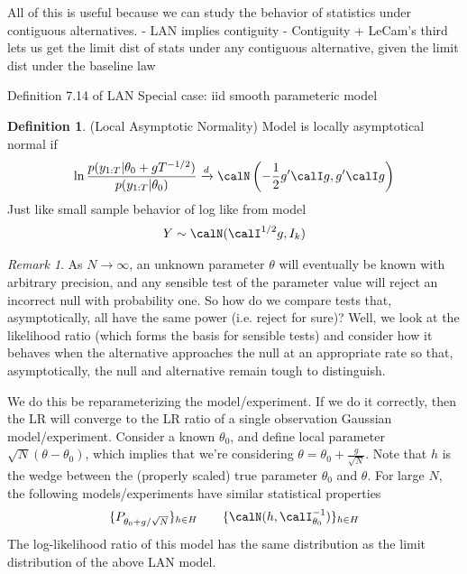 \documentclass[12pt]{article}
\theoremstyle{plain}
\theoremstyle{definition}
\newtheorem{defn}[thm]{Definition}
\theoremstyle{remark}
\newtheorem*{rmk}{Remark}
\newcommand{\ra}{\rightarrow}
\newcommand{\dto}{\xrightarrow{d}}
\begin{document}
All of this is useful because we can study the behavior of statistics
under contiguous alternatives.
- LAN implies contiguity
- Contiguity + LeCam's third lets us get the limit dist of stats under
  any contiguous alternative, given the limit dist under the baseline
  law

Definition 7.14 of LAN
Special case: iid smooth parameteric model



\begin{defn}(Local Asymptotic Normality)
Model is locally asymptotical normal if
\begin{align*}
  \ln
  \frac{p(y_{1:T}|\theta_0+gT^{-1/2})}{p(y_{1:T}|\theta_0)}
  \dto
  \calN\left(-\frac{1}{2}g'\calI g, g'\calI g\right)
\end{align*}
Just like small sample behavior of log like from model
\begin{align*}
  Y \sim \calN(\calI^{1/2}g,I_k)
\end{align*}
\end{defn}

\begin{rmk}
As $N\ra\infty$, an unknown parameter $\theta$ will eventually be known
with arbitrary precision, and any sensible test of the parameter value
will reject an incorrect null with probability one.
So how do we compare tests that, asymptotically, all have the same power
(i.e. reject for sure)?
Well, we look at the likelihood ratio (which forms the basis for
sensible tests) and consider how it behaves when the alternative
approaches the null at an appropriate rate so that, asymptotically, the
null and alternative remain tough to distinguish.

We do this be reparameterizing the model/experiment.
If we do it correctly, then the LR will converge to the LR ratio of a
single observation Gaussian model/experiment.
Consider a known $\theta_0$, and define local parameter
$\sqrt{N}(\theta-\theta_0)$, which implies that we're considering
$\theta=\theta_0+\frac{g}{\sqrt{N}}$.
Note that $h$ is the wedge between the (properly scaled) true parameter
$\theta_0$ and $\theta$.
For large $N$, the following models/experiments have similar statistical
properties
\begin{align*}
  \{P_{\theta_0+g/\sqrt{N}}\}_{h\in H}
  \qquad
  \{\calN(h,\calI_{\theta_0}^{-1})\}_{h\in H}
\end{align*}
The log-likelihood ratio of this model has the same distribution as the
limit distribution of the above LAN model.
\end{rmk}
\end{document}
